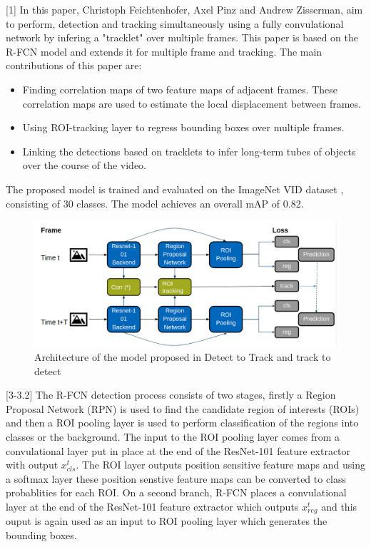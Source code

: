 \documentclass[conference]{IEEEtran}
\begin{document}
[1] In this paper, Christoph Feichtenhofer, Axel Pinz and Andrew Zisserman, aim to perform, detection and tracking simultaneously using a fully convulational network by infering a "tracklet" over multiple frames.  This paper is based on the R-FCN\cite{b19} model and extends it for multiple frame and tracking. The main contributions of this paper are:
\begin{itemize}
	\item Finding correlation maps of two feature maps of adjacent frames. These correlation maps are used to estimate the local displacement between frames.
	\item Using ROI-tracking layer to regress bounding boxes over multiple frames.
	\item Linking the detections based on tracklets to infer long-term tubes of objects over the course of the video.
\end{itemize}
The proposed model is trained and evaluated on the ImageNet VID dataset \cite{b35}, consisting of 30 classes. The model achieves an overall mAP of 0.82. \newline

\begin{figure}[h]
\includegraphics[width=\columnwidth]{D&T-architecture}
\caption{Architecture of the model proposed in Detect to Track and track to detect}
\end{figure}

[3-3.2] The R-FCN\cite{b19} detection process consists of two stages, firstly a Region Proposal Network (RPN)\cite{b38} is used to find the candidate region of interests (ROIs) and then a ROI pooling layer\cite{b39} is used to perform classification of the regions into classes or the background. The input to the ROI pooling layer comes from a convulational layer put in place at the end of the ResNet-101 feature extractor\cite{b40} with output $x^t_{cls}$. The ROI layer outputs position sensitive feature maps and using a softmax layer these position senstive feature maps can be converted to class probablities for each ROI. On a second branch, R-FCN places a convulational layer at the end of the ResNet-101 feature extractor which outputs $x^t_{reg}$ and this ouput is again used as an input to ROI pooling layer which generates the bounding boxes. \newline
\end{document}
